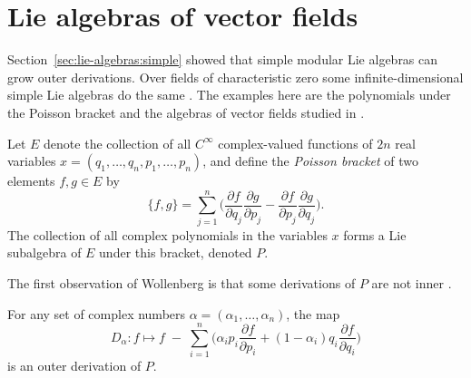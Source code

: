 \section{Lie algebras of vector fields}\label{sec:lie-algebras:vector-fields}

Section~\ref{sec:lie-algebras:simple} showed that simple modular Lie
algebras can grow outer derivations.  Over fields of characteristic zero
some infinite-dimensional simple Lie algebras do the same
\cite{Wollenberg1969,IkedaKawamoto1990,Li2019}.  The examples
here are the polynomials under the Poisson bracket and the algebras of
vector fields studied in
\cite{Wollenberg1969,IkedaKawamoto1990,Li2019,RandriambololondrantomalalaAsif2022}.

\begin{definition}\label{def:lie:poisson-bracket}
Let $E$ denote the collection of all $C^{\infty}$ complex-valued functions
of $2n$ real variables $x=(q_{1},\dots,q_{n},p_{1},\dots,p_{n})$, and
define the \emph{Poisson bracket} of two elements $f,g\in E$ by
\[
\{f,g\}=\sum_{j=1}^{n}\Big(\frac{\partial f}{\partial q_{j}}\frac{\partial g}{\partial p_{j}}-\frac{\partial f}{\partial p_{j}}\frac{\partial g}{\partial q_{j}}\Big).
\]
The collection of all complex polynomials in the variables $x$ forms a Lie
subalgebra of $E$ under this bracket, denoted $P$.
\end{definition}

The first observation of Wollenberg is that some derivations of $P$ are
not inner \cite[Lemma~1, p.~316]{Wollenberg1969}.

\begin{lemma}\label{lem:lie:wollenberg-outer}
For any set of complex numbers $\alpha=(\alpha_{1},\dots,\alpha_{n})$, the
map
\[
D_{\alpha}\colon f\longmapsto f\;-\;\sum_{i=1}^{n}\Big(\alpha_{i}p_{i}\frac{\partial f}{\partial p_{i}}+(1-\alpha_{i})q_{i}\frac{\partial f}{\partial q_{i}}\Big)
\]
is an outer derivation of $P$.
\end{lemma}

